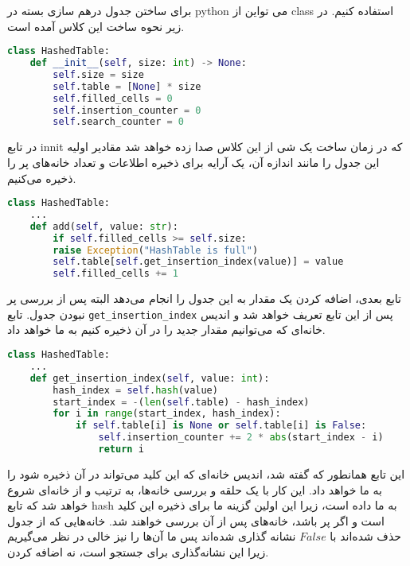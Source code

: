 \documentclass[]{article}
\begin{document}
برای ساختن جدول درهم سازی بسته در python می تواین از class استفاده کنیم.
در زیر نحوه ساخت این کلاس آمده است.
\begin{latin}
\begin{lstlisting}[language=Python]
class HashedTable:
    def __init__(self, size: int) -> None:
        self.size = size
        self.table = [None] * size
        self.filled_cells = 0
        self.insertion_counter = 0
        self.search_counter = 0
\end{lstlisting}
\end{latin}
در تابع innit که در زمان ساخت یک شی از این کلاس صدا زده خواهد شد
مقادیر اولیه این جدول را مانند اندازه آن، یک آرایه برای ذخیره اطلاعات و تعداد خانه‌های پر را ذخیره می‌کنیم.

\begin{latin}
\begin{lstlisting}[language=Python]
class HashedTable:
    ...
    def add(self, value: str):
        if self.filled_cells >= self.size:
        raise Exception("HashTable is full")
        self.table[self.get_insertion_index(value)] = value
        self.filled_cells += 1
\end{lstlisting}
\end{latin}
تابع بعدی، اضافه کردن یک مقدار به این جدول را انجام می‌دهد البته پس از بررسی پر نبودن جدول.
تابع \texttt{get\_insertion\_index} پس از این تابع تعریف خواهد شد
و اندیس خانه‌ای که می‌توانیم مقدار جدید را در آن ذخیره کنیم به ما خواهد داد.

\begin{latin}
\begin{lstlisting}[language=Python]
class HashedTable:
    ...
    def get_insertion_index(self, value: int):
        hash_index = self.hash(value)
        start_index = -(len(self.table) - hash_index)
        for i in range(start_index, hash_index):
            if self.table[i] is None or self.table[i] is False:
                self.insertion_counter += 2 * abs(start_index - i)
                return i
\end{lstlisting}
\end{latin}
این تابع همانطور که گفته شد، اندیس خانه‌ای که این کلید می‌تواند در آن ذخیره شود را به ما خواهد داد.
این کار با یک حلقه و بررسی خانه‌ها، به ترتیب و از خانه‌ای شروع خواهد شد که تابع hash
به ما داده است، زیرا این اولین گزینه ما برای ذخیره این کلید است و اگر پر باشد،
خانه‌های پس از آن بررسی خواهند شد.
خانه‌هایی که از جدول حذف شده‌اند با $False$
نشانه گذاری شده‌اند پس ما آن‌ها را نیز خالی در نظر می‌گیریم زیرا این نشانه‌گذاری برای جستجو است، نه اضافه کردن.
\end{document}
